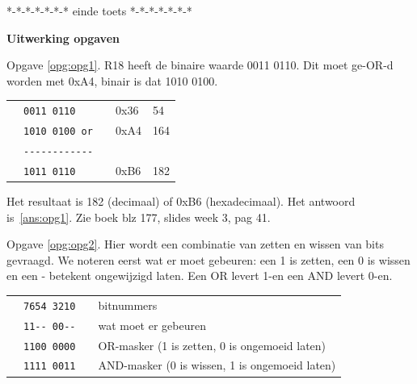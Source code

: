 \documentclass[a4paper,12pt,fleqn,dutch,mimicwordtwentyten]{tisdexam}
\begin{document}
\begin{questions}
\vskip5cm

\begin{center}
*-*-*-*-*-*-*     einde toets     *-*-*-*-*-*-*     
\end{center}



\ifprintanswers
\newpage
\textbf{Uitwerking opgaven}
\vspace{1cm}

Opgave \ref{opg:opg1}.\label{sol:opg1}
R18 heeft de binaire waarde 0011 0110. Dit moet ge-OR-d worden met 0xA4,
binair is dat 1010 0100.

\begin{table}[h!]
	\begin{tabular}{l l l l l}
		 & \texttt{0011 0110}      &  &  0x36  &  54   \\ 
	 	 & \texttt{1010 0100 or}   &  &  0xA4  &  164  \\ 
		 & \texttt{{-}{-}{-}{-}{-}{-}{-}{-}{-}{-}{-}{-}}  &  &        &       \\ 
		 & \texttt{1011 0110}      &  &  0xB6  &  182  \\
	\end{tabular} 
\end{table}
\unskip

Het resultaat is 182 (decimaal) of 0xB6 (hexadecimaal). Het antwoord
is~\ref{ans:opg1}. Zie boek blz 177, slides week 3, pag 41.

\vspace{1em}
Opgave \ref{opg:opg2}.\label{sol:opg2}
Hier wordt een combinatie van zetten en wissen van bits
gevraagd. We noteren eerst wat er moet gebeuren: een 1 is zetten, een 0 is
wissen en een - betekent ongewijzigd laten. Een OR levert 1-en een AND levert
0-en.

\begin{table}[h!]
	\begin{tabular}{l l l l}
		 & \texttt{7654 3210}  &  &  bitnummers   \\ 
	 	 & \texttt{11{-}- 00{-}-}  &  &  wat moet er gebeuren \\ 
		 & \texttt{1100 0000}  &  &  OR-masker (1 is zetten, 0 is ongemoeid laten)    \\ 
		 & \texttt{1111 0011}  &  &  AND-masker  (0 is wissen, 1 is ongemoeid laten)  \\
	\end{tabular} 
\end{table}


\end{questions}
\end{document}
